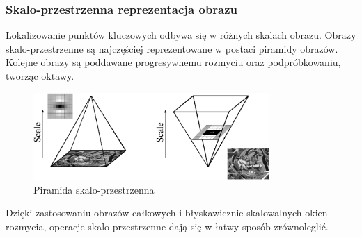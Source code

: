 \subsubsection{Skalo-przestrzenna reprezentacja obrazu}
Lokalizowanie punktów kluczowych odbywa się w różnych skalach obrazu. Obrazy skalo-przestrzenne są najczęściej reprezentowane w postaci piramidy obrazów. Kolejne obrazy są poddawane progresywnemu rozmyciu oraz podpróbkowaniu, tworząc oktawy.
\begin{figure}[!htb]
\centering
\includegraphics[width=0.8\textwidth]{pict/02/surf/surf_bay_scale_piramid.png}
\caption{Piramida skalo-przestrzenna}
\label{fig:surf_bay_scale_piramid}
\end{figure}


Dzięki zastosowaniu obrazów całkowych i błyskawicznie skalowalnych okien rozmycia, operacje skalo-przestrzenne dają się w łatwy sposób zrównoleglić.



